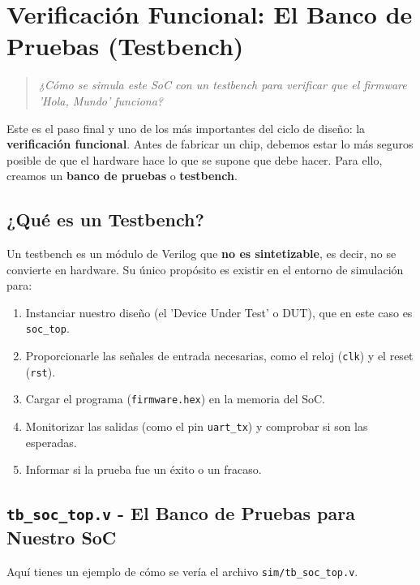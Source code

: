 \documentclass[12pt,a4paper]{article}
\newenvironment{pregunta}
  {\begin{leftbar}\begin{quote}\itshape}
  {\end{quote}\end{leftbar}}
\begin{document}
\newpage
\section{Verificación Funcional: El Banco de Pruebas (Testbench)}

\begin{pregunta}
¿Cómo se simula este SoC con un testbench para verificar que el firmware 'Hola, Mundo' funciona?
\end{pregunta}

Este es el paso final y uno de los más importantes del ciclo de diseño: la \textbf{verificación funcional}. Antes de fabricar un chip, debemos estar lo más seguros posible de que el hardware hace lo que se supone que debe hacer. Para ello, creamos un \textbf{banco de pruebas} o \textbf{testbench}.

\subsection{¿Qué es un Testbench?}

Un testbench es un módulo de Verilog que \textbf{no es sintetizable}, es decir, no se convierte en hardware. Su único propósito es existir en el entorno de simulación para:
\begin{enumerate}
    \item Instanciar nuestro diseño (el 'Device Under Test' o DUT), que en este caso es \texttt{soc\_top}.
    \item Proporcionarle las señales de entrada necesarias, como el reloj (\texttt{clk}) y el reset (\texttt{rst}).
    \item Cargar el programa (\texttt{firmware.hex}) en la memoria del SoC.
    \item Monitorizar las salidas (como el pin \texttt{uart\_tx}) y comprobar si son las esperadas.
    \item Informar si la prueba fue un éxito o un fracaso.
\end{enumerate}

\subsection{\texttt{tb\_soc\_top.v} - El Banco de Pruebas para Nuestro SoC}

Aquí tienes un ejemplo de cómo se vería el archivo \texttt{sim/tb\_soc\_top.v}.
\end{document}
